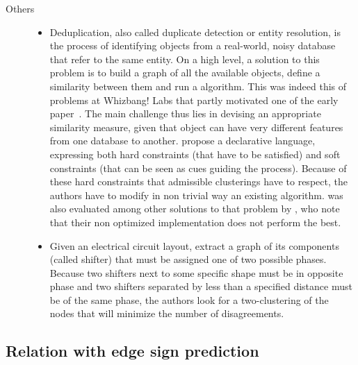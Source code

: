 \begin{description}
   \item[Others]
      \begin{itemize}[leftmargin=*]
	 \item
	    Deduplication, also called duplicate detection or entity resolution, is the process
	    of identifying objects from a real-world, noisy database that refer to the same entity.
	    On a high level, a solution to this problem is to build a graph of all the available
	    objects, define a similarity between them and run a \pcc{} algorithm. This was indeed
	    this of problems at Whizbang! Labs that partly motivated one of the early \pcc{}
	    paper~\autocite{Bansal2002}. The main challenge
	    thus lies in devising an appropriate similarity measure, given that object can have very
	    different features from one database to another. \Textcite{LargeScaleDeDup09} propose a
	    declarative language, expressing both hard constraints (that have to be satisfied) and
	    soft constraints (that can be seen as cues guiding the process). Because of these hard
	    constraints that admissible clusterings have to respect, the authors have to modify in
	    non trivial way an existing \pcc{} algorithm. \pcc{} was also evaluated among other
	    solutions to that problem by \textcite{DeDup09}, who note that their non optimized
	    implementation does not perform the best.
	 \item 
	    Given an electrical circuit layout, \textcite{circuitDesign07} extract a graph of its
	    components (called shifter) that must be assigned one of two possible phases. Because
	    two shifters next to some specific shape must be in opposite phase and two shifters
	    separated by less than a specified distance must be of the same phase, the authors look
	    for a two-clustering of the nodes that will minimize the number of disagreements.
      \end{itemize}
\end{description}

\subsection{Relation with edge sign prediction}
\label{sub:relation_with_edge_sign_prediction}

